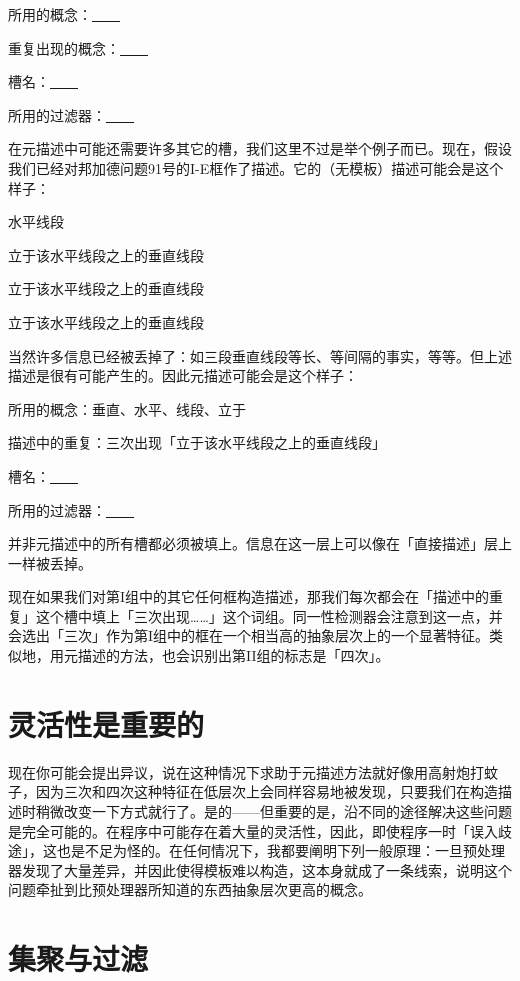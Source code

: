 \documentclass[
  12pt,
  twoside,
  openright,
  oldfontcommands,
]{memoir}
\begin{document}
所用的概念：\underline{　　}

重复出现的概念：\underline{　　}

槽名：\underline{　　}

所用的过滤器：\underline{　　}

在元描述中可能还需要许多其它的槽，我们这里不过是举个例子而已。现在，假设我们已经对邦加德问题91号的I-E框作了描述。它的（无模板）描述可能会是这个样子：

水平线段

立于该水平线段之上的垂直线段

立于该水平线段之上的垂直线段

立于该水平线段之上的垂直线段

当然许多信息已经被丢掉了：如三段垂直线段等长、等间隔的事实，等等。但上述描述是很有可能产生的。因此元描述可能会是这个样子：

所用的概念：垂直、水平、线段、立于

描述中的重复：三次出现「立于该水平线段之上的垂直线段」

槽名：\underline{　　}

所用的过滤器：\underline{　　}

并非元描述中的所有槽都必须被填上。信息在这一层上可以像在「直接描述」层上一样被丢掉。

现在如果我们对第I组中的其它任何框构造描述，那我们每次都会在「描述中的重复」这个槽中填上「三次出现\ldots\ldots」这个词组。同一性检测器会注意到这一点，并会选出「三次」作为第I组中的框在一个相当高的抽象层次上的一个显著特征。类似地，用元描述的方法，也会识别出第II组的标志是「四次」。

\section{灵活性是重要的}

现在你可能会提出异议，说在这种情况下求助于元描述方法就好像用高射炮打蚊子，因为三次和四次这种特征在低层次上会同样容易地被发现，只要我们在构造描述时稍微改变一下方式就行了。是的------但重要的是，沿不同的途径解决这些问题是完全可能的。在程序中可能存在着大量的灵活性，因此，即使程序一时「误入歧途」，这也是不足为怪的。在任何情况下，我都要阐明下列一般原理：一旦预处理器发现了大量差异，并因此使得模板难以构造，这本身就成了一条线索，说明这个问题牵扯到比预处理器所知道的东西抽象层次更高的概念。

\section{集聚与过滤}
\end{document}
